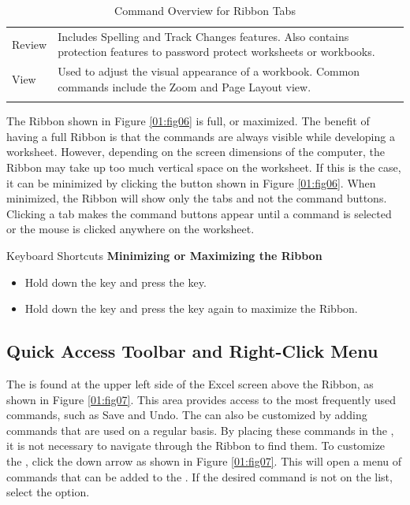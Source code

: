 \begin{table}[H]
{\begin{longtable}{L{0.75in}L{3.50in}}
			Review & Includes Spelling and Track Changes features. Also contains protection features to password protect worksheets or workbooks.\\
			
			View & Used to adjust the visual appearance of a workbook. Common commands include the Zoom and Page Layout view.\\

			\caption{Command Overview for Ribbon Tabs}
			\label{01:tab01}
		\end{longtable}
	} %
\end{table}

The Ribbon shown in Figure \ref{01:fig06} is full, or maximized. The benefit of having a full Ribbon is that the commands are always visible while developing a worksheet. However, depending on the screen dimensions of the computer, the Ribbon may take up too much vertical space on the worksheet. If this is the case, it can be minimized by clicking the button shown in Figure \ref{01:fig06}. When minimized, the Ribbon will show only the tabs and not the command buttons. Clicking a tab makes the command buttons appear until a command is selected or the mouse is clicked anywhere on the worksheet.

\begin{center}
	\begin{shtcutbox}{Keyboard Shortcuts}
		\textbf{Minimizing or Maximizing the Ribbon}
		\\
		\begin{itemize}
			\setlength{\itemsep}{0pt}
			\setlength{\parskip}{0pt}
			\setlength{\parsep}{0pt}
			
			\item Hold down the  key and press the  key.
			\item Hold down the  key and press the  key again to maximize the Ribbon.
			
		\end{itemize}
	\end{shtcutbox}
\end{center}

\subsection{Quick Access Toolbar and Right-Click Menu}

The  is found at the upper left side of the Excel screen above the Ribbon, as shown in Figure \ref{01:fig07}. This area provides access to the most frequently used commands, such as Save and Undo. The  can also be customized by adding commands that are used on a regular basis. By placing these commands in the , it is not necessary to navigate through the Ribbon to find them. To customize the , click the down arrow as shown in Figure \ref{01:fig07}. This will open a menu of commands that can be added to the . If the desired command is not on the list, select the  option.

